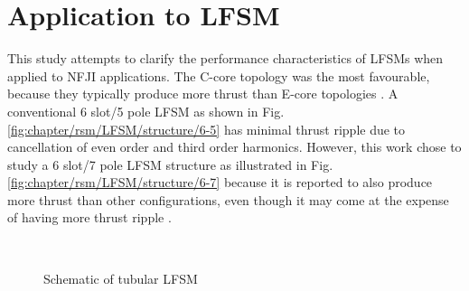     \section{Application to LFSM}               \label{Chapter:RSM/LFSM}
    
    
        This study attempts to clarify the performance characteristics of \acsp{LFSM} when applied to \acs{NFJI} applications. The C-core topology was the most favourable, because they typically produce more thrust than E-core topologies \cite{Min2011}. A conventional 6 slot/5 pole \acs{LFSM} as shown in Fig.\,\ref{fig:chapter/rsm/LFSM/structure/6-5} has minimal thrust ripple due to cancellation of even order and third order harmonics. However, this work chose to study a 6 slot/7 pole LFSM structure as illustrated  in Fig.\,\ref{fig:chapter/rsm/LFSM/structure/6-7} because it is reported to also produce more thrust than other configurations, even though it may come at the expense of having more thrust ripple \cite{Chen2010}. 
        
        
        \begin{figure}[!ht]
            \centering
            \\
            \caption{Schematic of tubular \acs{LFSM}
                \label{fig:conventional_flux_switching_machines}
            }\label{fig:chapter/rsm/LFSM/structure}
        \end{figure}
        

